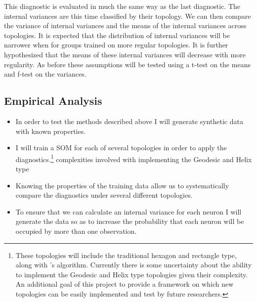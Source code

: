 \documentclass[10pt,titlepage]{article}
\begin{document}
This diagnostic is evaluated in much the same way as the last diagnostic.  
The internal variances are this time classified by their topology.  We can then
compare the variance of internal variances and the means of the internal
variances across topologies.  It is expected that the distribution of internal
variances will be narrower when for groups trained on more regular topologies.
It is further hypothesized that the means of these internal variances will
decrease with more regularity.  As before these assumptions will be tested using
a t-test on the means and f-test on the variances.


\subsection{Empirical Analysis}
\begin{itemize}
\item In order to test the methods described above I will generate synthetic data with
known properties.
\item I will train a SOM for each of several topologies in order to apply the
diagnostics.\footnote{These topologies will include the traditional hexagon and
rectangle type, along with \cite{Rakhmanov94}'s algorithm. Currently there is
some uncertainty about the ability to implement the Geodesic and Helix type
topologies given their complexity. An additional goal of this project to provide
a framework on which new topologies can be easily implemented and test by future
researchers.}
complexities involved with implementing the Geodesic and Helix type 
\item Knowing the properties of the training data allow us to systematically
compare the diagnostics under several different topologies.
\item To ensure that we can calculate an internal variance for
each neuron I will generate the data so as to increase the
probability that each neuron will be occupied by more than one observation.
\end{itemize}


\end{document}
